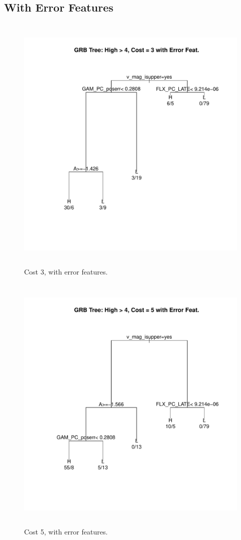 \documentclass[10pt]{article}
\begin{document}
\subsection{With Error Features}

\begin{figure}[H]
\begin{center}
\includegraphics[height=5in,width=5in]{ErrorCost3.pdf}
\caption{Cost 3, with error features.\label{fig:ErrorCost3}}
\end{center}
\end{figure}


\begin{figure}[H]
\begin{center}
\includegraphics[height=5in,width=5in]{ErrorCost5.pdf}
\caption{Cost 5, with error features.\label{fig:ErrorCost5}}
\end{center}
\end{figure}
\end{document}
